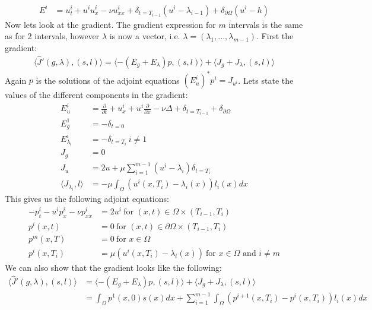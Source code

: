 \documentclass[11pt,a4paper]{report}
\begin{document}
\begin{align*}
E^i &= u_t^i + u^iu_x^i - \nu u_{xx}^i +\delta_{t=T_{i-1}}(u^i-\lambda_{i-1}) + \delta_{\partial \Omega}(u^i-h)
\end{align*}
Now lets look at the gradient. The gradient expression for $m$ intervals is the same as for 2 intervals, however $\lambda$ is now a vector, i.e. $\lambda =(\lambda_1,...,\lambda_{m-1})$. First the gradient:
\begin{align*}
\langle \hat{J}'(g,\lambda), (s,l)\rangle =\langle -(E_g+E_{\lambda})p , (s,l)\rangle + \langle J_g+J_{\lambda}, (s,l)\rangle
\end{align*}
Again $p$ is the solutions of the adjoint equations $(E_u^i)^*p^i = J_{u^i}$. Lets state the values of the different components in the gradient: 
\begin{align*}
E_u^i&=\frac{\partial}{\partial t} + u_x^i + u^i\frac{\partial}{\partial x} - \nu\Delta + \delta_{t=T_{i-1}} + \delta_{\partial \Omega} \\
E_g^1 &= -\delta_{t=0} \\
E_{\lambda_i}^i &= -\delta_{t=T_i} \ i\neq 1 \\
J_g &= 0 \\
J_{u} &= 2u + \mu\sum_{i=1}^{m-1} (u^i - \lambda_i)\delta_{t=T_i} \\
\langle J_{\lambda_i},l\rangle &= -\mu\int_{\Omega} (u^i(x,T_i)-\lambda_i(x))l_i(x)dx
\end{align*}
This gives us the following adjoint equations:
\begin{align*}
-p_t^i -u^ip_x^i - \nu p_{xx}^i &= 2u^i \ \text{for $(x,t)\in \Omega\times(T_{i-1},T_i)$}\\
p^i(x,t) &= 0 \ \text{for $(x,t) \in\partial\Omega\times(T_{i-1},T_i)$ } \\
p^m(x,T) &= 0 \ \text{for $x \in\Omega$ } \\
p^i(x,T_i) &= \mu(u^i(x,T_i)-\lambda_i(x)) \ \text{for $x \in\Omega$ and $i\neq m$}
\end{align*}
We can also show that the gradient looks like the following:
\begin{align*}
\langle \hat{J}'(g,\lambda), (s,l)\rangle &=\langle -(E_g+E_{\lambda})p , (s,l)\rangle + \langle J_g+J_{\lambda}, (s,l)\rangle \\
&= \int_{\Omega} p^1(x,0)s(x)dx + \sum_{i=1}^{m-1}\int_{\Omega} (p^{i+1}(x,T_i)-p^i(x,T_i))l_i(x)dx
\end{align*}
\end{document}
